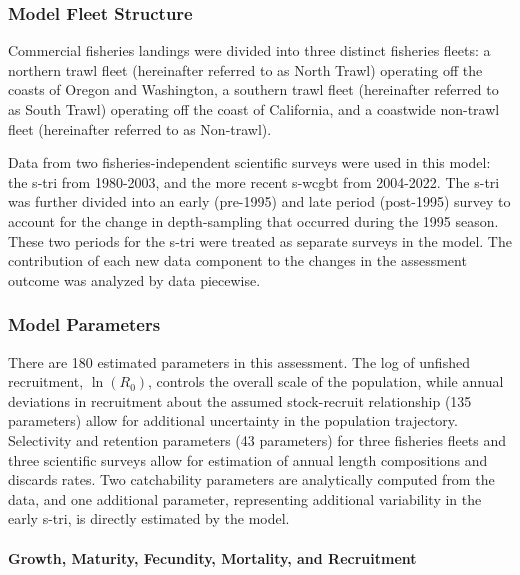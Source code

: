 \documentclass[11pt,
  english,
  letterpaper,
]{article}
\begin{document}
\hypertarget{model-fleet-structure}{%
\subsubsection{Model Fleet Structure}\label{model-fleet-structure}}

Commercial fisheries landings were divided into three distinct fisheries fleets: a northern trawl fleet (hereinafter referred to as North Trawl) operating off the coasts of Oregon and Washington, a southern trawl fleet (hereinafter referred to as South Trawl) operating off the coast of California, and a coastwide non-trawl fleet (hereinafter referred to as Non-trawl).

Data from two fisheries-independent scientific surveys were used in this model: the \gls{s-tri} from 1980-2003, and the more recent \gls{s-wcgbt} from 2004-2022. The \gls{s-tri} was further divided into an early (pre-1995) and late period (post-1995) survey to account for the change in depth-sampling that occurred during the 1995 season. These two periods for the \gls{s-tri} were treated as separate surveys in the model. The contribution of each new data component to the changes in the assessment outcome was analyzed by data piecewise.

\hypertarget{model-parameters}{%
\subsubsection{Model Parameters}\label{model-parameters}}

There are 180 estimated parameters in this assessment. The log of unfished recruitment, \(\ln(R_0)\), controls the overall scale of the population, while annual deviations in recruitment about the assumed stock-recruit relationship (135 parameters) allow for additional uncertainty in the population trajectory. Selectivity and retention parameters (43 parameters) for three fisheries fleets and three scientific surveys allow for estimation of annual length compositions and discards rates. Two catchability parameters are analytically computed from the data, and one additional parameter, representing additional variability in the early \gls{s-tri}, is directly estimated by the model.

\hypertarget{growth-maturity-fecundity-mortality-and-recruitment}{%
\paragraph{Growth, Maturity, Fecundity, Mortality, and Recruitment}\label{growth-maturity-fecundity-mortality-and-recruitment}}
\end{document}
